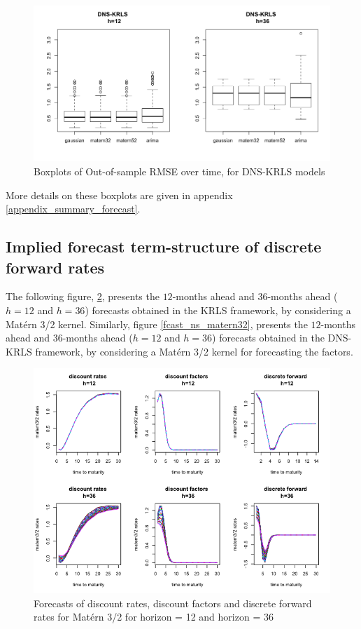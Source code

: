 \begin{figure}[!htb]
\centering
\includegraphics[width=12cm]{gfx/chapter-krls-models/oos_rmse_dns_krls_2}
\caption{Boxplots of Out-of-sample RMSE over time, for DNS-KRLS models}
\label{oos_rmse_dns_krls_2}
\end{figure}

More details on these boxplots are given in appendix \ref{appendix_summary_forecast}. 

\newpage

\subsection{Implied forecast term-structure of discrete forward rates}
\label{sec:fcast_curves}

The following figure, \ref{fcast_matern32}, presents the $12$-months ahead and $36$-months ahead ($h = 12$ and $h = 36$) forecasts obtained in the KRLS framework, by considering a Mat\'ern 3/2 kernel. Similarly, figure \ref{fcast_ns_matern32}, presents the $12$-months ahead and $36$-months ahead ($h = 12$ and $h = 36$) forecasts obtained in the DNS-KRLS framework, by considering a Mat\'ern 3/2 kernel for forecasting the factors. 

\begin{figure}[!htb]
\centering
\includegraphics[width=12.5cm]{gfx/chapter-krls-models/fcast_matern32}
\caption{Forecasts of discount rates, discount factors and discrete forward rates for Mat\'ern 3/2 for horizon = 12 and horizon = 36}
\label{fcast_matern32}
\end{figure}


